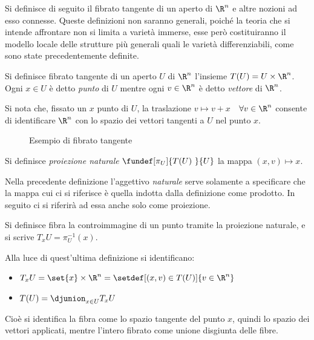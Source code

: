 


Si definisce di seguito il fibrato tangente di un aperto di $\R ^n$ e altre nozioni ad esso connesse.
Queste definizioni non saranno generali, poiché la teoria che si intende affrontare non si limita a varietà immerse, esse però costituiranno il modello locale delle strutture più generali quali le varietà differenziabili, come sono state precedentemente definite.

\begin{defn}
Si definisce fibrato tangente di un aperto $U$ di $\R ^n$ l'insieme $T(U) = U \times \R ^n$. Ogni $x\in U$ è detto \emph{punto} di $U$ mentre ogni $v\in \R ^n$ è detto \emph{vettore} di $\R ^n$.
\end{defn}

Si nota che, fissato un $x$ punto di $U$, la traslazione $v \mapsto v + x$~~$\forall v\in \R ^n$  consente di identificare $\R ^n$ con lo spazio dei vettori tangenti a $U$ nel punto $x$.

\begin{figure}[b]
\centering

\caption{Esempio di fibrato tangente}
\end{figure}


\begin{defn}
Si definisce \emph{proiezione naturale} $\fundef[\pi _U]{T(U)~}{U}$ la mappa $(x,v) \mapsto x$.
\end{defn}

Nella precedente definizione l'aggettivo \emph{naturale} serve solamente a specificare che la mappa cui ci si riferisce è quella indotta dalla definizione come prodotto. In seguito ci si riferirà ad essa anche solo come proiezione.

\begin{defn}[Fibra]
Si definisce fibra la controimmagine di un punto tramite la proiezione naturale, e si scrive $T_x U = \pi ^{-1} _U (x)$.
\end{defn}

Alla luce di quest'ultima definizione si identificano:
\begin{itemize}
\item $T_x U = \set{x} \times \R ^n = \setdef[(x,v)\in T(U)]{v \in \R^n}$
\item $T(U) = \djunion_{x \in U} T_x U$
\end{itemize}
Cioè si identifica la fibra come lo spazio tangente del punto $x$, quindi lo spazio dei vettori applicati, mentre l'intero fibrato come unione disgiunta delle fibre.

